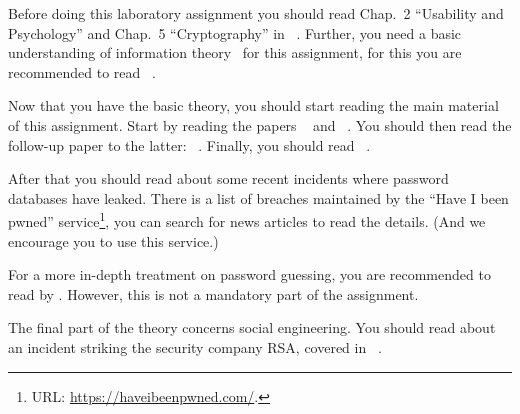 Before doing this laboratory assignment you should read Chap.~2 ``Usability and 
Psychology'' and Chap.~5 ``Cryptography'' in 
~\cite{Anderson2008sea}.
Further, you need a basic understanding of information 
theory~\cite{Shannon1948amt} for this assignment, for this you are recommended 
to read ~\cite{Ueltschi2013se}.

Now that you have the basic theory, you should start reading the main material 
of this assignment.
Start by reading the papers ~\cite{Kuo2006hso} and 
~\cite{Komanduri2011opa}.
You should then read the follow-up paper to the latter: 
~\cite{Komanduri2014can}.
Finally, you should read ~\cite{kelley2012guess}.

After that you should read about some recent incidents where password databases 
have leaked.
There is a list of breaches maintained by the \enquote{Have I been pwned} 
service\footnote{%
  URL: \url{https://haveibeenpwned.com/}.
}, you can search for news articles to read the details.
(And we encourage you to use this service.)

For a more in-depth treatment on password guessing, you are recommended to read 
 by \citet{Bonneau2012ghs}.
However, this is not a mandatory part of the assignment.

The final part of the theory concerns social engineering.
You should read about an incident striking the security company RSA, covered in 
~\cite{Fisher2011rsa}.
